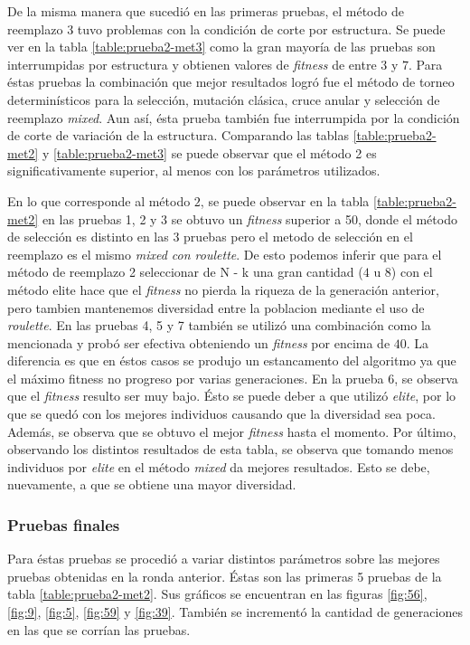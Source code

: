 \documentclass[11pt,a4paper]{article}
\begin{document}
De la misma manera que sucedió en las primeras pruebas, el método de reemplazo 3 tuvo problemas con la condición de corte por estructura. Se puede ver en la tabla \ref{table:prueba2-met3} como la gran mayoría de las pruebas son interrumpidas por estructura y obtienen valores de \emph{fitness} de entre $3$ y $7$. Para éstas pruebas la combinación que mejor resultados logró fue el método de torneo determinísticos para la selección, mutación clásica, cruce anular y selección de reemplazo \emph{mixed}. Aun así, ésta prueba también fue interrumpida por la condición de corte de variación de la estructura. Comparando las tablas \ref{table:prueba2-met2} y \ref{table:prueba2-met3} se puede observar que el método 2 es significativamente superior, al menos con los parámetros utilizados.

En lo que corresponde al método $2$, se puede observar en la tabla \ref{table:prueba2-met2} en las pruebas 1, 2 y 3 se obtuvo un \emph{fitness} superior a 50, donde el método de selección es distinto en las 3 pruebas pero el metodo de selección en el reemplazo es el mismo \emph{mixed con roulette}. De esto podemos inferir que para el método de reemplazo 2 seleccionar de N - k una gran cantidad ($4$ u $8$) con el método elite hace que el \emph{fitness} no pierda la riqueza de la generación anterior, pero tambien mantenemos diversidad entre la poblacion mediante el uso de \emph{roulette}. En las pruebas 4, 5 y 7 también se utilizó una combinación como la mencionada y probó ser efectiva obteniendo un \emph{fitness} por encima de $40$. La diferencia es que en éstos casos se produjo un estancamento del algoritmo ya que el máximo fitness no progreso por varias generaciones. En la prueba 6, se observa que el \emph{fitness} resulto ser muy bajo. Ésto se puede deber a que utilizó \emph{elite}, por lo que se quedó con los mejores individuos causando que la diversidad sea poca. Además, se observa que se obtuvo el mejor \emph{fitness} hasta el momento. Por último, observando los distintos resultados de esta tabla, se observa que tomando menos individuos por \emph{elite} en el método \emph{mixed} da mejores resultados. Esto se debe, nuevamente, a que se obtiene una mayor diversidad.

\subsubsection{Pruebas finales}

Para éstas pruebas se procedió a variar distintos parámetros sobre las mejores pruebas obtenidas en la ronda anterior. Éstas son las primeras 5 pruebas de la tabla \ref{table:prueba2-met2}. Sus gráficos se encuentran en las figuras \ref{fig:56}, \ref{fig:9}, \ref{fig:5}, \ref{fig:59} y \ref{fig:39}. También se incrementó la cantidad de generaciones en las que se corrían las pruebas. 
\end{document}
